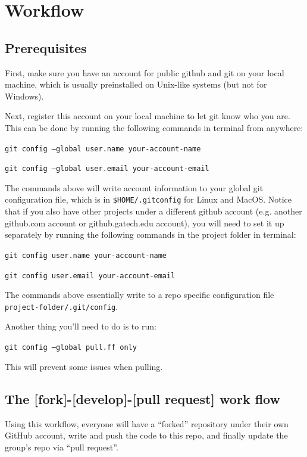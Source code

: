 \documentclass{article}
\begin{document}
\section{Workflow}

\subsection{Prerequisites}

First, make sure you have an account for public github and git on your local machine,
which is usually preinstalled on Unix-like systems (but not for Windows).

Next, register this account on your local machine to let git know who you are.
This can be done by running the following commands in terminal from anywhere:

\texttt{git config --global user.name your-account-name}

\texttt{git config --global user.email your-account-email}

The commands above will write account information to your global git configuration file, which is in \texttt{\$HOME/.gitconfig}
for Linux and MacOS.
Notice that if you also have other projects under a different github account (e.g. another github.com account
or github.gatech.edu account), you will need to set it up separately by running the following
commands in the project folder in terminal:

\texttt{git config user.name your-account-name}

\texttt{git config user.email your-account-email}

The commands above essentially write to a repo specific configuration file \texttt{project-folder/.git/config}.

Another thing you'll need to do is to run:

\texttt{git config --global pull.ff only}

This will prevent some issues when pulling.

\subsection{The [fork]-[develop]-[pull request] work flow}

Using this workflow, everyone will have a ``forked'' repository under their own GitHub account,
write and push the code to this repo, and finally update the group's repo via ``pull request''.
\end{document}
